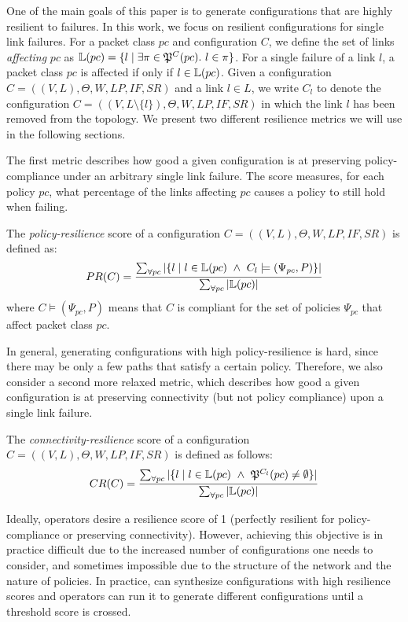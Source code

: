 One of the main goals of this paper is to 
generate configurations that are highly resilient to failures. In this
work, we focus on resilient configurations for single link failures. 
For a packet class $pc$ and configuration $C$, we define 
the set of links \emph{affecting} $pc$ as 
$\mathbb{L}(pc) = \{l \mid \exists \pi \in \mathfrak{P}^C(pc).~l \in \pi  \}$.
For a single failure of a link $l$, a packet class $pc$ is affected 
if only if $l \in \mathbb{L}(pc)$. 
Given a configuration
$C=((V,L), \Theta,W,LP,IF,SR)$ and a link $l\in L$,
we write $C_l$ 
to denote the configuration
$C=((V,L\setminus\{l\}), \Theta,W,LP,IF,SR)$
in which the link $l$ has been removed from the topology.
We present two different resilience metrics 
we will use in the following sections. 

The first metric describes how good a given configuration
is at preserving policy-compliance under an 
arbitrary single link failure. 
The score measures, for each policy $pc$, what percentage of the links affecting $pc$
causes a policy to still hold when failing.
\begin{definition}
The \emph{policy-resilience} score of a configuration 
$C=((V,L), \Theta,W,LP,IF,SR)$
is defined as:
\[
PR(C)=\frac{\sum_{\forall pc} |\{ l \mid l \in \mathbb{L}(pc) ~\wedge~ C_l \models (\Psi_{pc}, P) \}|}
{\sum_{\forall pc} |\mathbb{L}(pc)|}
\]
where $C \models (\Psi_{pc}, P)$ means that $C$ is 
compliant for the set of policies $\Psi_{pc}$ that affect packet class $pc$.
\end{definition}

In general, generating configurations with high policy-resilience is hard,
since there may be only a few paths that satisfy a certain policy.
Therefore, we also consider a second 
more relaxed metric, which describes how 
good a given configuration
is at preserving connectivity
(but not policy compliance) upon a single link failure. 
\begin{definition}
The \emph{connectivity-resilience} 
score of a configuration $C=((V,L), \Theta,W,LP,IF,SR)$
is defined as follows:
\[
CR(C)=\frac{\sum_{\forall pc} |\{ l \mid l \in \mathbb{L}(pc) ~\wedge~\mathfrak{P}^{C_l }(pc) \not= \emptyset  \}|}
{\sum_{\forall pc} |\mathbb{L}(pc)|}
\]
\end{definition}
 
Ideally, operators desire a resilience score of 1 (perfectly resilient for policy-compliance or
preserving connectivity). However, achieving this objective is in practice difficult  
due to the 
increased number of configurations one needs to consider,
and sometimes impossible due to the structure of the network and the nature of policies.
In practice, \name can synthesize configurations 
with high resilience scores and operators can run it to generate different configurations until
a threshold score is crossed. 

